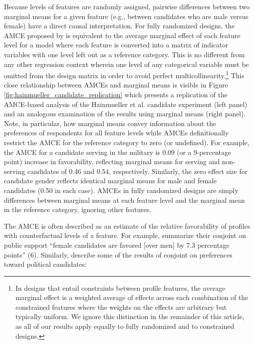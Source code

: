 \documentclass[a4paper,12pt]{article}\usepackage[]{graphicx}\usepackage[]{color}
\begin{document}
Because levels of features are randomly assigned, pairwise differences between two marginal means for a given feature (e.g., between candidates who are male versus female) have a direct causal interpretation. For fully randomized designs, the AMCE proposed by \citet{HainmuellerHopkinsYamamoto2014} is equivalent to the average marginal effect of each feature level for a model where each feature is converted into a matrix of indicator variables with one level left out as a reference category. This is no different from any other regression context wherein one level of any categorical variable must be omitted from the design matrix in order to avoid perfect multicollinearity.\footnote{In designs that entail constraints between profile features, the average marginal effect is a weighted average of effects across each combination of the constrained features where the weights on the effects are arbitrary but typically uniform. We ignore this distinction in the remainder of this article, as all of our results apply equally to fully randomized and to constrained designs.} This close relationship between AMCEs and marginal means is visible in Figure \ref{fig:hainmueller_candidate_replication} which presents a replication of the AMCE-based analysis of the Hainmueller et al. candidate experiment (left panel) and an analogous examination of the results using marginal means (right panel). Note, in particular, how marginal means convey information about the preferences of respondents for all feature levels while AMCEs definitionally restrict the AMCE for the reference category to zero (or undefined). For example, the AMCE for a candidate serving in the military is 0.09 (or a 9-percentage point) increase in favorability, reflecting marginal means for serving and non-serving candidates of 0.46 and 0.54, respectively. Similarly, the zero effect size for candidate gender reflects identical marginal means for male and female candidates (0.50 in each case). AMCEs in fully randomized designs are simply differences between marginal means at each feature level and the marginal mean in the reference category, ignoring other features.

The AMCE is often described as an estimate of the relative favorability of profiles with counterfactual levels of a feature. For example, \citet{TeeleKallaRosenbluth2018} summarize their conjoint on public support ``female candidates are favored [over men] by 7.3 percentage points'' (6). Similarly, \citet{HainmuellerHopkinsYamamoto2014} describe some of the results of conjoint on preferences toward political candidates:
\end{document}
